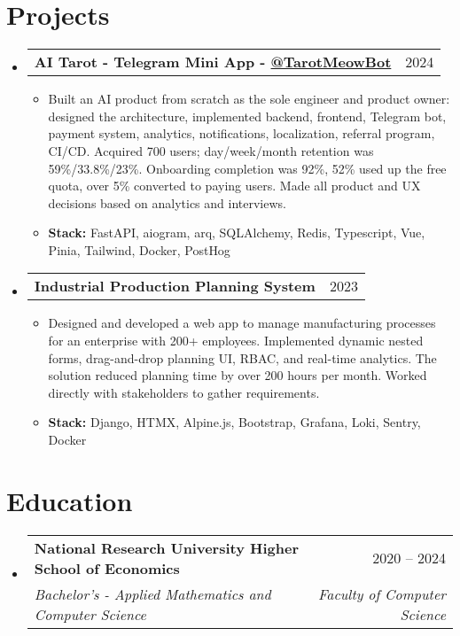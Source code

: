 \documentclass[letterpaper,11pt]{article}
\makeatletter
\newcommand{\resumeSubheading}[4]{
  \vspace{-1pt}\item
    \begin{tabular*}{0.97\textwidth}[t]{l@{\extracolsep{\fill}}r}
      \textbf{#1} & #2 \\
      \textit{\small#3} & \textit{\small #4} \\
    \end{tabular*}\vspace{-8pt}
}
\newcommand{\resumeProjectHeading}[2]{
    \item
    \begin{tabular*}{0.97\textwidth}{l@{\extracolsep{\fill}}r}
      \small#1 & #2 \\
    \end{tabular*}\vspace{-8pt}
}
\newcommand{\resumeSubHeadingListStart}{\begin{itemize}[leftmargin=0.15in, label={}]}
\newcommand{\resumeSubHeadingListEnd}{\end{itemize}}
\makeatother
\begin{document}
\section{Projects}
    \resumeSubHeadingListStart
    \resumeProjectHeading
        {\textbf{AI Tarot - Telegram Mini App - \href{https://t.me/tarotmeowbot/app?startapp=r-resume}{@TarotMeowBot}}}{2024}
        \small\vspace{-8pt}\begin{itemize}[leftmargin=0.15in, label={}]
        \item{Built an AI product from scratch as the sole engineer and product owner: designed the architecture, implemented backend, frontend, Telegram bot, payment system, analytics, notifications, localization, referral program, CI/CD. Acquired 700 users; day/week/month retention was 59\%/33.8\%/23\%. Onboarding completion was 92\%, 52\% used up the free quota, over 5\% converted to paying users. Made all product and UX decisions based on analytics and interviews.}
        \end{itemize}
        \small\vspace{-8pt}\begin{itemize}[leftmargin=0.15in, label={}]
        \item{\textbf{Stack:} FastAPI, aiogram, arq, SQLAlchemy, Redis, Typescript, Vue, Pinia, Tailwind, Docker, PostHog}
        \end{itemize}

    \vspace{-8pt}
    \resumeProjectHeading
        {\textbf{Industrial Production Planning System}}{2023}
        \small\vspace{-8pt}\begin{itemize}[leftmargin=0.15in, label={}]
        \item{Designed and developed a web app to manage manufacturing processes for an enterprise with 200+ employees. Implemented dynamic nested forms, drag-and-drop planning UI, RBAC, and real-time analytics. The solution reduced planning time by over 200 hours per month. Worked directly with stakeholders to gather requirements.}
        \end{itemize}
        \small\vspace{-8pt}\begin{itemize}[leftmargin=0.15in, label={}]
        \item{\textbf{Stack:} Django, HTMX, Alpine.js, Bootstrap, Grafana, Loki, Sentry, Docker}
        \end{itemize}
    \resumeSubHeadingListEnd

\section{Education}
  \resumeSubHeadingListStart
    \resumeSubheading
      {National Research University Higher School of Economics}{2020 -- 2024}
      {Bachelor's - Applied Mathematics and Computer Science}{Faculty of Computer Science}
  \resumeSubHeadingListEnd
\end{document}
